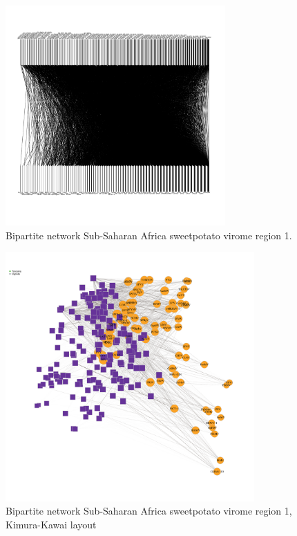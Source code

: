 \documentclass{article}
\begin{document}
\begin{figure}[h!]
\begin{center}
\includegraphics[width=0.75\textwidth]{../results/k-cluster3/3-kcluster_bipartitenetwork_Feb28.pdf
} %
\caption{Bipartite network Sub-Saharan Africa sweetpotato virome region 1.}
\end{center}
\end{figure}



\begin{figure}[h!]
\begin{center}
\includegraphics[width=0.85\textwidth]{../results/k-cluster1/1-kcluster_bipartitenetwork-kk_Feb28.pdf
} %
\caption{Bipartite network Sub-Saharan Africa sweetpotato virome region 1, Kimura-Kawai layout}
\end{center}
\end{figure}
\end{document}
